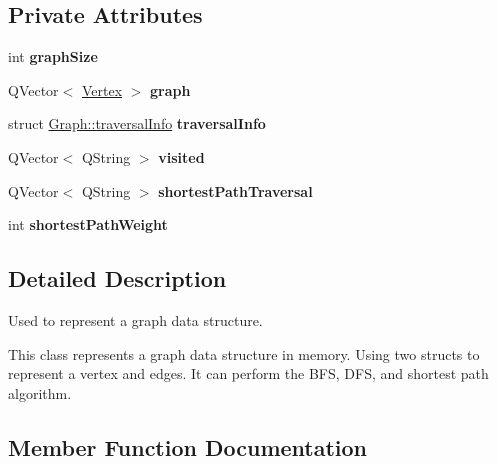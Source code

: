 \subsection*{Private Attributes}
\begin{DoxyCompactItemize}
\item 
\mbox{\label{class_graph_afe71579cdcdc5c7b9645c76a6e45f06a}} 
int {\bfseries graph\+Size}
\item 
\mbox{\label{class_graph_aecb9b42f86fac7b1ee568e116d3dd7d5}} 
Q\+Vector$<$ \hyperlink{struct_vertex}{Vertex} $>$ {\bfseries graph}
\item 
\mbox{\label{class_graph_aa5e915f5ba679440537d34af1bd065ca}} 
struct \hyperlink{struct_graph_1_1traversal_info}{Graph\+::traversal\+Info} {\bfseries traversal\+Info}
\item 
\mbox{\label{class_graph_a01fe0226a8bdafa6eee4198aa6837c74}} 
Q\+Vector$<$ Q\+String $>$ {\bfseries visited}
\item 
\mbox{\label{class_graph_a7cb3226a43c4008c3420d9c07f7654f0}} 
Q\+Vector$<$ Q\+String $>$ {\bfseries shortest\+Path\+Traversal}
\item 
\mbox{\label{class_graph_afe57755d6ba7f57ea4aae950f5b90eef}} 
int {\bfseries shortest\+Path\+Weight}
\end{DoxyCompactItemize}


\subsection{Detailed Description}
Used to represent a graph data structure. 

This class represents a graph data structure in memory. Using two structs to represent a vertex and edges. It can perform the B\+FS, D\+FS, and shortest path algorithm. 

\subsection{Member Function Documentation}
\mbox{\label{class_graph_a11be2135c68163907d6bb1a268316876}} 
